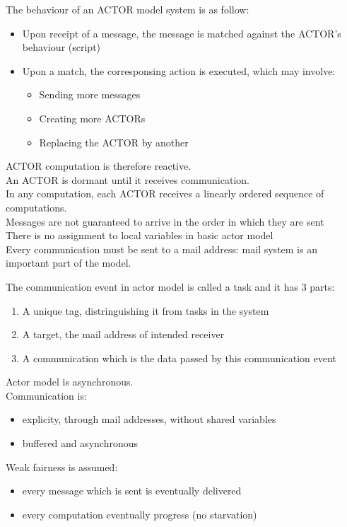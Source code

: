 The behaviour of an ACTOR model system is as follow:
\begin{itemize}
\item Upon receipt of a message, the message is matched against the ACTOR's behaviour (script)
\item Upon a match, the corresponsing action is executed, which may involve:
\begin{itemize}
\item Sending more messages
\item Creating more ACTORs
\item Replacing the ACTOR by another
\end{itemize}
\end{itemize}

ACTOR computation is therefore reactive.\\
An ACTOR is dormant until it receives communication.\\
In any computation, each ACTOR receives a linearly ordered sequence of computations.\\
Messages are not guaranteed to arrive in the order in which they are sent\\
There is no assignment to local variables in basic actor model\\
Every communication must be sent to a mail address: mail system is an important part of the model.

The communication event in actor model is called a task and it has 3 parts:
\begin{enumerate}
\item A unique tag, distringuishing it from tasks in the system
\item A target, the mail address of intended receiver
\item A communication which is the data passed by this communication event
\end{enumerate}

Actor model is asynchronous.\\
Communication is:
\begin{itemize}
\item explicity, through mail addresses, without shared variables 
\item buffered and asynchronous
\end{itemize}
Weak fairness is assumed:
\begin{itemize}
\item every message which is sent is eventually delivered
\item every computation eventually progress (no starvation)
\end{itemize}

